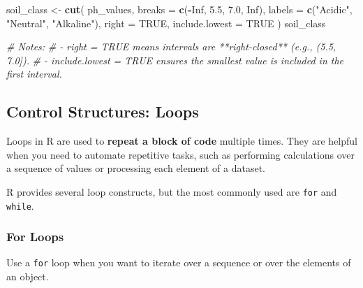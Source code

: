 \documentclass[
  10pt,
  b5paper,
  oneside]{book}
\newenvironment{Shaded}{\begin{snugshade}}{\end{snugshade}}
\newcommand{\AttributeTok}[1]{\textcolor[rgb]{0.13,0.29,0.53}{#1}}
\newcommand{\CommentTok}[1]{\textcolor[rgb]{0.56,0.35,0.01}{\textit{#1}}}
\newcommand{\ConstantTok}[1]{\textcolor[rgb]{0.56,0.35,0.01}{#1}}
\newcommand{\FloatTok}[1]{\textcolor[rgb]{0.00,0.00,0.81}{#1}}
\newcommand{\FunctionTok}[1]{\textcolor[rgb]{0.13,0.29,0.53}{\textbf{#1}}}
\newcommand{\NormalTok}[1]{#1}
\newcommand{\OtherTok}[1]{\textcolor[rgb]{0.56,0.35,0.01}{#1}}
\newcommand{\SpecialCharTok}[1]{\textcolor[rgb]{0.81,0.36,0.00}{\textbf{#1}}}
\newcommand{\StringTok}[1]{\textcolor[rgb]{0.31,0.60,0.02}{#1}}
\begin{document}
\begin{Shaded}
\begin{Highlighting}[]
\NormalTok{soil\_class }\OtherTok{\textless{}{-}} \FunctionTok{cut}\NormalTok{(}
\NormalTok{  ph\_values,}
  \AttributeTok{breaks =} \FunctionTok{c}\NormalTok{(}\SpecialCharTok{{-}}\ConstantTok{Inf}\NormalTok{, }\FloatTok{5.5}\NormalTok{, }\FloatTok{7.0}\NormalTok{, }\ConstantTok{Inf}\NormalTok{),}
  \AttributeTok{labels =} \FunctionTok{c}\NormalTok{(}\StringTok{"Acidic"}\NormalTok{, }\StringTok{"Neutral"}\NormalTok{, }\StringTok{"Alkaline"}\NormalTok{),}
  \AttributeTok{right =} \ConstantTok{TRUE}\NormalTok{, }\AttributeTok{include.lowest =} \ConstantTok{TRUE}
\NormalTok{)}
\NormalTok{soil\_class}

\CommentTok{\# Notes:}
\CommentTok{\# {-} \textasciigrave{}right = TRUE\textasciigrave{} means intervals are **right{-}closed** (e.g., \textasciigrave{}(5.5, 7.0]\textasciigrave{}).}
\CommentTok{\# {-} \textasciigrave{}include.lowest = TRUE\textasciigrave{} ensures the smallest value is included in the first interval.}
\end{Highlighting}
\end{Shaded}

\subsection{Control Structures: Loops}\label{control-structures}

Loops in R are used to \textbf{repeat a block of code} multiple times. They are helpful when you need to automate repetitive tasks, such as performing calculations over a sequence of values or processing each element of a dataset.

R provides several loop constructs, but the most commonly used are \texttt{for} and \texttt{while}.

\subsubsection{For Loops}\label{for-loop}

Use a \texttt{for} loop when you want to iterate over a sequence or over the elements of an object.
\end{document}
